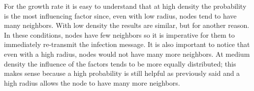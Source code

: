 For the growth rate it is easy to understand that at high density the probability is the most influencing factor since, even with low radius, nodes tend to have many neighbors. With low density the results are similar, but for another reason. In these conditions, nodes have few neighbors so it is imperative for them to immediately re-transmit the infection message. It is also important to notice that even with a high radius, nodes would not have many more neighbors. At medium density the influence of the factors tends to be more equally distributed; this makes sense because a high probability is still helpful as previously said and a high radius allows the node to have many more neighbors.

